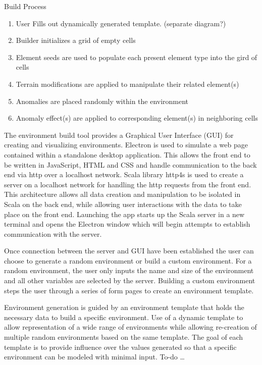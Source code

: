 \documentclass[]{report}
\begin{document}
Build Process
\begin{enumerate}
  \item User Fills out dynamically generated template. (separate diagram?)
  \item	Builder initializes a grid of empty cells
  \item	Element seeds are used to populate each present element type into the gird of cells
  \item	Terrain modifications are applied to manipulate their related element(s)
  \item	Anomalies are placed randomly within the environment
  \item	Anomaly effect(s) are applied to corresponding element(s) in neighboring cells
\end{enumerate}

The environment build tool provides a Graphical User Interface (GUI) for creating and visualizing environments.
Electron  is used to simulate a web page contained within a standalone desktop application.
This allows the front end to be written in JavaScript, HTML and CSS and handle communication to the back end via http over a localhost network.
Scala library http4s  is used to create a server on a localhost network for handling the http requests from the front end.
This architecture allows all data creation and manipulation to be isolated in Scala on the back end, while allowing user interactions with the data to take place on the front end.
Launching the app starts up the Scala server in a new terminal and opens the Electron window which will begin attempts to establish communication with the server.

Once connection between the server and GUI have been established the user can choose to generate a random environment or build a custom environment. 
For a random environment, the user only inputs the name and size of the environment and all other variables are selected by the server.
Building a custom environment steps the user through a series of form pages to create an environment template.

Environment generation is guided by an environment template that holds the necessary data to build a specific environment. 
Use of a dynamic template to allow representation of a wide range of environments while allowing re-creation of multiple random environments based on the same template.
The goal of each template is to provide influence over the values generated so that a specific environment can be modeled with minimal input.
To-do …
\end{document}
